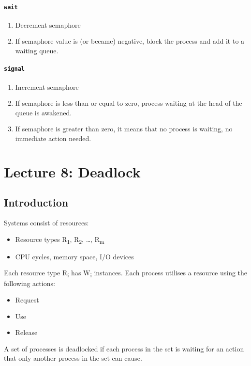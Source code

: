 \documentclass{article}%
\begin{document}
\paragraph{\texttt{wait}}
\label{sec:org4cdc875}
\begin{enumerate}
\item Decrement semaphore
\item If semaphore value is (or became) negative, block the process and add it to a waiting queue.
\end{enumerate}

\paragraph{\texttt{signal}}
\label{sec:orgf3aea07}
\begin{enumerate}
\item Increment semaphore
\item If semaphore is less than or equal to zero, process waiting at the head of the queue is awakened.
\item If semaphore is greater than zero, it means that no process is waiting, no immediate action needed.
\end{enumerate}

\maketitle
\section{Lecture 8: Deadlock}


\subsection{Introduction}
\label{sec:org56b1e3d}
Systems consist of resources:
\begin{itemize}
\item Resource types R\textsubscript{1}, R\textsubscript{2}, \ldots{}, R\textsubscript{m}
\item CPU cycles, memory space, I/O devices
\end{itemize}
Each resource type R\textsubscript{i} has W\textsubscript{i} instances.
Each process utilises a resource using the following actions:
\begin{itemize}
\item Request
\item Use
\item Release
\end{itemize}
A set of processes is deadlocked if each process in the set is waiting for an action that only another process in the set can cause.
\end{document}
